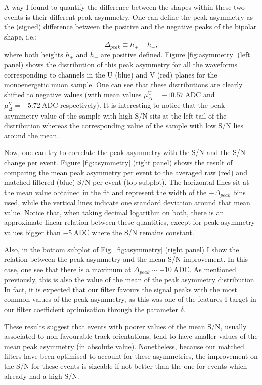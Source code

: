 A way I found to quantify the difference between the shapes within these two events is their different peak asymmetry. One can define the peak asymmetry as the (signed) difference between the positive and the negative peaks of the bipolar shape, i.e.:
\begin{equation}
\Delta_{peak} \equiv h_{+} - h_{-},
\end{equation}
where both heights $h_{+}$ and $h_{-}$ are positive defined. Figure \ref{fig:asymmetry} (left panel) shows the distribution of this peak asymmetry for all the waveforms corresponding to channels in the U (blue) and V (red) planes for the monoenergetic muon sample. One can see that these distributions are clearly shifted to negative values (with mean values $\mu_{\Delta}^{\mathrm{U}} = -10.57 \ \mathrm{ADC}$ and $\mu_{\Delta}^{\mathrm{V}} = -5.72 \ \mathrm{ADC}$ respectively). It is interesting to notice that the peak asymmetry value of the sample with high S/N sits at the left tail of the distribution whereas the corresponding value of the sample with low S/N lies around the mean.

Now, one can try to correlate the peak asymmetry with the S/N and the S/N change per event. Figure \ref{fig:asymmetry} (right panel) shows the result of comparing the mean peak asymmetry per event to the averaged raw (red) and matched filtered (blue) S/N per event (top subplot). The horizontal lines sit at the mean value obtained in the fit and represent the width of the $-\Delta_{peak}$ bins used, while the vertical lines indicate one standard deviation around that mean value. Notice that, when taking decimal logarithm on both, there is an approximate linear relation between these quantities, except for peak asymmetry values bigger than $- 5 \ \mathrm{ADC}$ where the S/N remains constant.

Also, in the bottom subplot of Fig. \ref{fig:asymmetry} (right panel) I show the relation between the peak asymmetry and the mean S/N improvement. In this case, one see that there is a maximum at $\Delta_{peak} \sim -10 \ \mathrm{ADC}$. As mentioned previously, this is also the value of the mean of the peak asymmetry distribution. In fact, it is expected that our filter favours the signal peaks with the most common values of the peak asymmetry, as this was one of the features I target in our filter coefficient optimisation through the parameter $\delta$.

These results suggest that events with poorer values of the mean S/N, usually associated to non-favourable track orientations, tend to have smaller values of the mean peak asymmetry (in absolute value). Nonetheless, because our matched filters have been optimised to account for these asymmetries, the improvement on the S/N for these events is sizeable if not better than the one for events which already had a high S/N.

